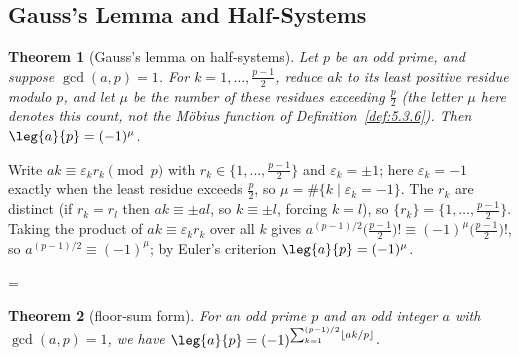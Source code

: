 \documentclass[11pt]{article}
\makeatletter
\theoremstyle{ntstyle}
\newtheorem{theorem}{Theorem}[subsection]
\let\nt@closedisplay\]
\def\nt@guardedclose{\@ifnextchar\par{\nt@closeafterpar}{\@ifnextchar\end{\postdisplaypenalty\@M\nt@closedisplay}{\nt@closedisplay}}}
\def\nt@closeafterpar\par{\@ifnextchar\par{\nt@closeafterpar}{\@ifnextchar\end{\postdisplaypenalty\@M\nt@closedisplay\par}{\nt@closedisplay\par}}}
\renewenvironment{proof}[1][\proofname]{\par
  \pushQED{\qed}\normalfont\topsep\medskipamount\edef\nt@afterproof{\@endparpenalty=\the\@endparpenalty\relax}\@beginparpenalty\@M\@endparpenalty\@M\let\]\nt@guardedclose\trivlist\item[]\textit{#1\@addpunct{.}} \ignorespaces}{\ifvmode\addpenalty\@M\fi\popQED\nt@afterproof\endtrivlist\@endpefalse}
\makeatother
\begin{document}
\subsection{Gauss's Lemma and Half-Systems}
\begin{theorem}[Gauss's lemma on half-systems]\label{thm:7.3.1} Let $p$ be an odd
	prime, and suppose $\gcd(a, p) = 1$. For $k = 1, \ldots, \tfrac{p-1}{2}$,
	reduce $ak$ to its least positive residue modulo $p$, and let $\mu$
	be the number of these residues exceeding $\tfrac{p}{2}$ (the letter
	$\mu$ here denotes this count, not the M{\"o}bius function of
	Definition~\ref{def:5.3.6}). Then
	$\leg{a}{p} = (-1)^{\mu}$.

\end{theorem}

\begin{proof} Write $ak \equiv \varepsilon_k r_k \pmod{p}$
	with $r_k \in \{1, \ldots, \tfrac{p-1}{2}\}$ and $\varepsilon_k = \pm
		1$; here $\varepsilon_k = -1$ exactly when the least residue exceeds
	$\tfrac{p}{2}$, so $\mu = \#\{k \mid \varepsilon_k = -1\}$. The $r_k$
	are distinct (if $r_k = r_l$ then $ak \equiv \pm al$, so $k \equiv
		\pm l$, forcing $k = l$), so $\{r_k\} = \{1, \ldots,
		\tfrac{p-1}{2}\}$. Taking the product of $ak \equiv \varepsilon_k
		r_k$ over all $k$ gives $a^{(p-1)/2}\big(\tfrac{p-1}{2}\big)! \equiv
		(-1)^{\mu}\big(\tfrac{p-1}{2}\big)!$, so $a^{(p-1)/2} \equiv
		(-1)^{\mu}$; by Euler's criterion $\leg{a}{p} =
		(-1)^{\mu}$.

\end{proof}
\begin{theorem}[floor-sum form]\label{thm:7.3.2} For an odd prime $p$
	and an odd integer $a$ with $\gcd(a, p) = 1$, we have $\leg{a}{p} =
		(-1)^{\sum_{k=1}^{(p-1)/2} \lfloor ak/p \rfloor}$.

\end{theorem}
\end{document}
